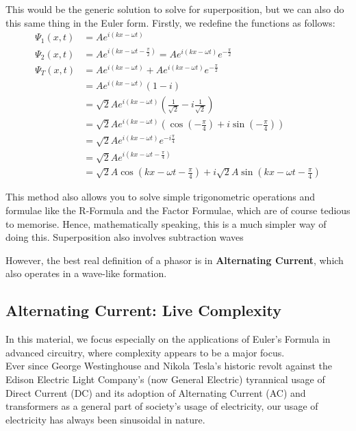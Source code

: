 \documentclass[a4paper,12pt,oneside]{book}
\begin{document}
This would be the generic solution to solve for superposition, but we can also do this same thing in the Euler form. Firstly, we redefine the functions as follows:
\begin{align*}
    \Psi_1(x, t) &= A e^{i \left(kx - \omega t \right)} \\
    \Psi_2(x, t) &= A e^{i \left(kx - \omega t - \frac{\pi}{2} \right)} = A e^{i \left(kx - \omega t \right)} e^{-\frac{\pi}{2}}  \\
    \Psi_T(x, t) &= A e^{i \left(kx - \omega t \right)} + A e^{i \left(kx - \omega t \right)} e^{-\frac{\pi}{2}}  \\
    &= A e^{i \left(kx - \omega t \right)} \left( 1 - i \right) \\
    &= \sqrt{2} A e^{i \left(kx - \omega t \right)} \left(\frac{1}{\sqrt{2}} - i \frac{1}{\sqrt{2}} \right) \\
    &= \sqrt{2} A e^{i \left(kx - \omega t \right)} \left(\cos\left(-\frac{\pi}{4}\right) + i\sin\left(-\frac{\pi}{4}\right) \right) \\
    &= \sqrt{2} A e^{i \left(kx - \omega t \right)} e^{-i\frac{\pi}{4}} \\
    &= \sqrt{2} A e^{i\left(kx - \omega t - \frac{\pi}{4} \right)} \\
    &= \sqrt{2} A \cos\left(kx - \omega t - \frac{\pi}{4} \right) + i\sqrt{2} A \sin\left(kx - \omega t - \frac{\pi}{4} \right)
\end{align*}

This method also allows you to solve simple trigonometric operations and formulae like the R-Formula and the Factor Formulae, which are of course tedious to memorise. Hence, mathematically speaking, this is a much simpler way of doing this. Superposition also involves subtraction waves 


However, the best real definition of a phasor is in \textbf{Alternating Current}, which also operates in a wave-like formation. \\

\newpage
\subsection{Alternating Current: Live Complexity}

In this material, we focus especially on the applications of Euler's Formula in advanced circuitry, where complexity appears to be a major focus. \\

Ever since George Westinghouse and Nikola Tesla's historic revolt against the Edison Electric Light Company's (now General Electric) tyrannical usage of Direct Current (DC) and its adoption of Alternating Current (AC) and transformers as a general part of society's usage of electricity, our usage of electricity has always been sinusoidal in nature. \\
\end{document}
